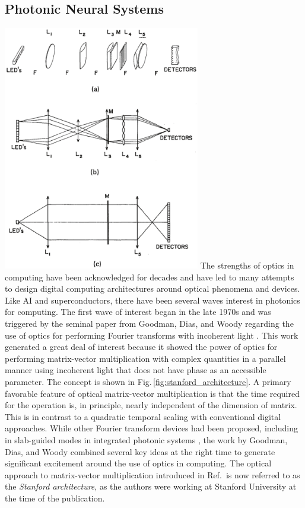 \subsection{\label{sec:photonic_neural_systems}Photonic Neural Systems}
\includegraphics[width=8.6cm]{figures/_stanford_architecture.pdf}
The strengths of optics in computing have been acknowledged for decades and have led to many attempts to design digital computing architectures around optical phenomena and devices. Like AI and superconductors, there have been several waves interest in photonics for computing. The first wave of interest began in the late 1970s and was triggered by the seminal paper from Goodman, Dias, and Woody regarding the use of optics for performing Fourier transforms with incoherent light \cite{godi1978}. This work generated a great deal of interest because it showed the power of optics for performing matrix-vector multiplication with complex quantities in a parallel manner using incoherent light that does not have phase as an accessible parameter. The concept is shown in Fig.\,\ref{fig:stanford_architecture}. A primary favorable feature of optical matrix-vector multiplication is that the time required for the operation is, in principle, nearly independent of the dimension of matrix. This is in contrast to a quadratic temporal scaling with conventional digital approaches. While other Fourier transform devices had been proposed, including in slab-guided modes in integrated photonic systems \cite{shha1968,anbo1977}, the work by Goodman, Dias, and Woody combined several key ideas at the right time to generate significant excitement around the use of optics in computing. The optical approach to matrix-vector multiplication introduced in Ref.\, is now referred to as the \textit{Stanford architecture}, as the authors were working at Stanford University at the time of the publication.

